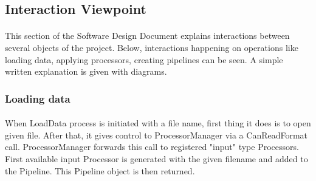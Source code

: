 
\subsection{Interaction Viewpoint}
\paragraph{}
\normalsize
This section of the Software Design Document explains interactions between several objects of the project. Below, interactions happening on operations like loading data, applying processors, creating pipelines can be seen. A simple written explanation is given with diagrams.\\

\skipsubsection

\subsubsection{Loading data}
\paragraph{}
\normalsize
When LoadData process is initiated with a file name, first thing it does is to open given file. After that, it gives control to ProcessorManager via a CanReadFormat call. ProcessorManager forwards this call to registered "input" type Processors. First available input Processor is generated with the given filename and added to the Pipeline. This Pipeline object is then returned.\\

